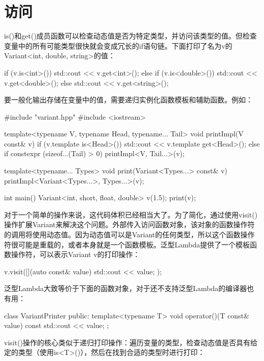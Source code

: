 \section{访问}

is()和get()成员函数可以检查动态值是否为特定类型，并访问该类型的值。但检查变量中的所有可能类型很快就会变成冗长的if语句链。下面打印了名为v的Variant<int, double, string>的值：

\begin{cpp}
if (v.is<int>()) {
	std::cout << v.get<int>();
}
else if (v.is<double>()) {
	std::cout << v.get<double>();
}
else {
	std::cout << v.get<string>();
}
\end{cpp}

要一般化输出存储在变量中的值，需要递归实例化函数模板和辅助函数。例如：

\begin{cpp}
#include "variant.hpp"
#include <iostream>

template<typename V, typename Head, typename... Tail>
void printImpl(V const& v) {
	if (v.template is<Head>()) {
		std::cout << v.template get<Head>();
	}
	else if constexpr (sizeof...(Tail) > 0) {
		printImpl<V, Tail...>(v);
	}
}

template<typename... Types>
void print(Variant<Types...> const& v) {
	printImpl<Variant<Types...>, Types...>(v);
}

int main() {
	Variant<int, short, float, double> v(1.5);
	print(v);
}
\end{cpp}

对于一个简单的操作来说，这代码体积已经相当大了。为了简化，通过使用visit()操作扩展Variant来解决这个问题。外部传入访问函数对象，该对象的函数操作符的调用将使用动态值。因为动态值可以是Variant的任何类型，所以这个函数操作符很可能是重载的，或者本身就是一个函数模板。泛型Lambda提供了一个模板函数操作符，可以表示Variant v的打印操作：

\begin{cpp}
v.visit([](auto const& value) {
			std::cout << value;
		});
\end{cpp}

泛型Lambda大致等价于下面的函数对象，对于还不支持泛型Lambda的编译器也有用：

\begin{cpp}
class VariantPrinter {
	public:
	template<typename T>
	void operator()(T const& value) const
	{
		std::cout << value;
	}
};
\end{cpp}

visit()操作的核心类似于递归打印操作：遍历变量的类型，检查动态值是否具有给定的类型（使用is<T>()），然后在找到合适的类型时进行打印：

